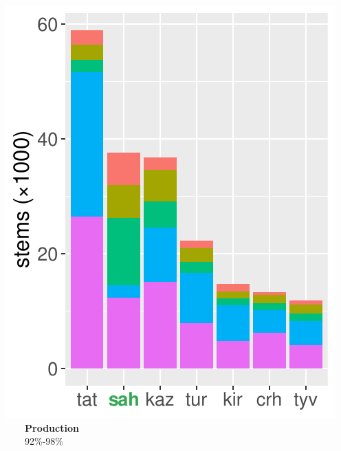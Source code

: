 \documentclass[a0paper,fleqn]{betterposter}
\begin{document}
{\vspace{-0.75em}
\begin{minipage}{0.317\textwidth}
    \centering
    \includegraphics[width=\textwidth]{img/lgs1}\vspace{-0.8em}\\
    {\color{lightgreen}~~~~\textbf{Production}}\\
    ~~~~92\%-98\%
\end{minipage}
\begin{minipage}{0.356\textwidth}
    \centering

\end{minipage}}
\end{document}
